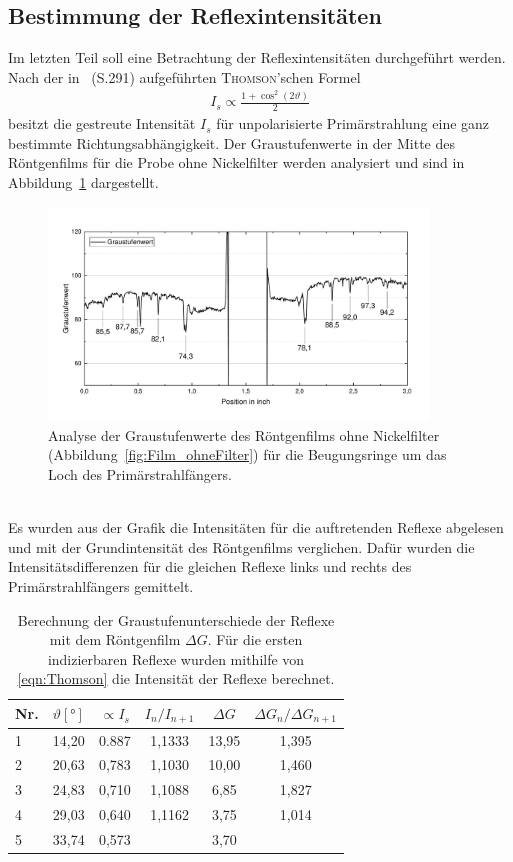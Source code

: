 \documentclass[a4paper,twoside,final]{article}
\begin{document}
\subsection{Bestimmung der Reflexintensitäten}
Im letzten Teil soll eine Betrachtung der Reflexintensitäten durchgeführt werden. Nach der in~\cite{Glocker} (S.291) aufgeführten \textsc{Thomson}'schen Formel
\begin{align}
  I_s \propto \frac{1+\cos^2(2\vartheta)}{2}\label{eqn:Thomson}
\end{align}
besitzt die gestreute Intensität $I_s$ für unpolarisierte Primärstrahlung eine ganz bestimmte Richtungsabhängigkeit.
Der Graustufenwerte in der Mitte des Röntgenfilms für die Probe ohne Nickelfilter werden analysiert und sind in Abbildung~\ref{fig:Intensitaet} dargestellt.
\begin{figure}[htp]
    \centering
        \includegraphics[width=0.9\textwidth]{Abbildungen/Intensitaeten.pdf}
    \caption{Analyse der Graustufenwerte des Röntgenfilms ohne Nickelfilter (Abbildung~\ref{fig:Film_ohneFilter}) für die Beugungsringe um das Loch des Primärstrahlfängers.}
    \label{fig:Intensitaet}
\end{figure}\\
Es wurden aus der Grafik die Intensitäten für die auftretenden Reflexe abgelesen und mit der Grundintensität des Röntgenfilms verglichen. Dafür wurden die Intensitätsdifferenzen für die gleichen Reflexe links und rechts des Primärstrahlfängers gemittelt.
\begin{table}[ht]
	\centering
	\caption{Berechnung der Graustufenunterschiede der Reflexe mit dem Röntgenfilm $\Delta G$. Für die ersten indizierbaren Reflexe wurden mithilfe von \eqref{eqn:Thomson} die Intensität der Reflexe berechnet.}
	\label{tab:Intensitäten}
	\begin{tabular}{l c c c S c}
		\toprule
      Nr. & $\vartheta [\si{\degree}]$ & $\propto I_s$ & $I_n / I_{n+1}$  & $\Delta G$ & $\Delta G_n / \Delta G_{n+1}$\\
     & 14,20 & 0.887 & 1,1333 & 13,95 & 1,395 \\
    2 & 20,63 & 0,783 & 1,1030 & 10,00 & 1,460 \\
    3 & 24,83 & 0,710 & 1,1088 & 6,85  & 1,827\\
    4 & 29,03 & 0,640 & 1,1162 & 3,75  & 1,014 \\
    5 & 33,74 & 0,573 &        & 3,70  &
	\end{tabular}
\end{table}\\
\end{document}
